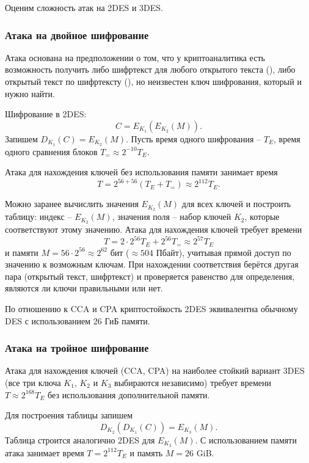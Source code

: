 Оценим сложность атак на 2DES и 3DES.

\subsubsection{Атака на двойное шифрование}


Атака основана на предположении о том, что у криптоаналитика есть возможность получить либо шифртекст для любого открытого текста (), либо открытый текст по шифртексту (), но неизвестен ключ шифрования, который и нужно найти.

Шифрование в 2DES:
    \[ C = E_{K_1}( E_{K_2}(M)). \]
Запишем $D_{K_1}(C) = E_{K_2}(M)$. Пусть время одного шифрования -- $T_E$, время одного сравнения блоков $T_{=} \approx 2^{-10} T_E$.

Атака для нахождения ключей без использования памяти занимает время
    \[ T = 2^{56 + 56} (T_E + T_{=}) \approx 2^{112} T_E. \]

Можно заранее вычислить значения $E_{K_2}(M)$ для всех ключей и построить таблицу: индекс -- $E_{K_2}(M)$, значения поля -- набор ключей $K_2$, которые соответствуют этому значению. Атака для нахождения ключей требует времени
    \[ T = 2 \cdot 2^{56} T_E + 2^{56} T_{=} \approx 2^{57} T_E \]
и памяти $M = 56 \cdot 2^{56} \approx 2^{62}$ бит ($\approx 504$ Пбайт), учитывая прямой доступ по значению к возможным ключам. При нахождении соответствия берётся другая пара (открытый текст, шифртекст) и проверяется равенство для определения, являются ли ключи правильными или нет.

По отношению к CCA и CPA криптостойкость 2DES эквивалентна обычному DES с использованием 26 ГиБ памяти.

\subsubsection{Атака на тройное шифрование}

Атака для нахождения ключей (CCA, CPA) на наиболее стойкий вариант 3DES (все три ключа $K_1$, $K_2$ и $K_3$ выбираются независимо) требует времени $T \approx 2^{168} T_E$ без использования дополнительной памяти.

Для построения таблицы запишем
    \[ D_{K_2}( D_{K_1}( C)) = E_{K_3} (M). \]
Таблица строится аналогично 2DES для $E_{K_3}(M)$. С использованием памяти атака занимает время $T = 2^{112} T_E$ и память $M = 26$ GiB.
